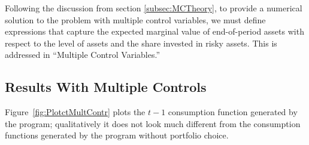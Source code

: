 \documentclass[titlepage, headings=optiontotocandhead]{econtex}
\begin{document}
Following the discussion from section \ref{subsec:MCTheory}, to provide a numerical solution to the problem
with multiple control variables, we must define expressions that capture the expected marginal value of end-of-period
assets with respect to the level of assets and the share invested in risky assets. This is addressed in ``Multiple Control Variables.''





\hypertarget{results-with-multiple-controls}{}
\subsection{Results With Multiple Controls}\label{subsec:results-with-multiple-controls}

Figure~\ref{fig:PlotctMultContr} plots the $t-1$ consumption function generated by the program; qualitatively it does not look much different from the consumption functions generated by the program without portfolio choice.
\end{document}
